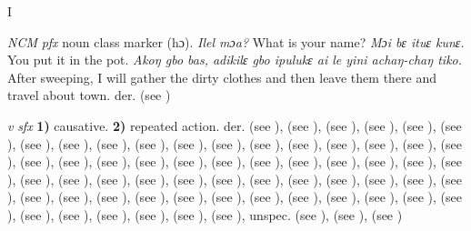 \begin{letter}{I}

 \textit{NCM} \textit{pfx} noun class marker (hɔ). \textit{Ilel mɔa?} What is your name? \textit{Mɔi bɛ ituɛ kunɛ.} You put it in the pot. \textit{Akoŋ gbo bas, adikilɛ gbo ipulukɛ ai le yini achaŋ-chaŋ tiko.} After sweeping, I will gather the dirty clothes and then leave them there and travel about town. der.  (see )

 \textit{v} \textit{sfx} \textbf{1)} causative. \textbf{2)} repeated action. der.  (see ),  (see ),  (see ),  (see ),  (see ),  (see ),  (see ),  (see ),  (see ),  (see ),  (see ),  (see ),  (see ),  (see ),  (see ),  (see ),  (see ),  (see ),  (see ),  (see ),  (see ),  (see ),  (see ),  (see ),  (see ),  (see ),  (see ),  (see ),  (see ),  (see ),  (see ),  (see ),  (see ),  (see ),  (see ),  (see ),  (see ),  (see ),  (see ),  (see ),  (see ), {} (see ),  (see ),  (see ),  (see ),  (see ),  (see ),  (see ),  (see ),  (see ),  (see ),  (see ),  (see ),  (see ),  (see ),  (see ),  (see ),  (see ),  (see ),  (see ), unspec.  (see ),  (see ),  (see )


\end{letter}
